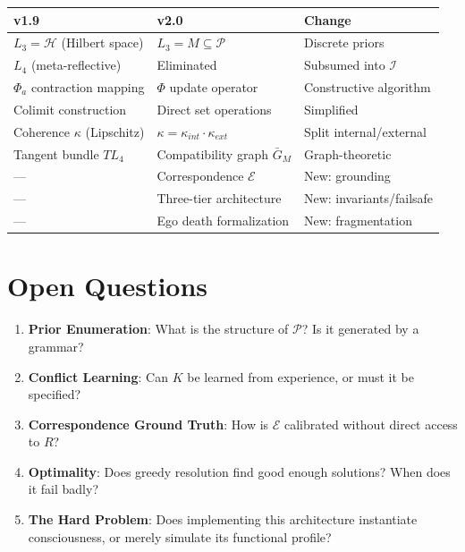 \documentclass[12pt,a4paper]{article}
\theoremstyle{definition}
\begin{document}
\begin{center}
\begin{tabular}{|l|l|l|}
\hline
\textbf{v1.9} & \textbf{v2.0} & \textbf{Change} \\
\hline
$L_3 = \mathcal{H}$ (Hilbert space) & $L_3 = M \subseteq \mathcal{P}$ & Discrete priors \\
$L_4$ (meta-reflective) & Eliminated & Subsumed into $\mathcal{I}$ \\
$\Phi_a$ contraction mapping & $\Phi$ update operator & Constructive algorithm \\
Colimit construction & Direct set operations & Simplified \\
Coherence $\kappa$ (Lipschitz) & $\kappa = \kappa_{int} \cdot \kappa_{ext}$ & Split internal/external \\
Tangent bundle $TL_4$ & Compatibility graph $\bar{G}_M$ & Graph-theoretic \\
--- & Correspondence $\mathcal{E}$ & New: grounding \\
--- & Three-tier architecture & New: invariants/failsafe \\
--- & Ego death formalization & New: fragmentation \\
\hline
\end{tabular}
\end{center}

\section{Open Questions}

\begin{enumerate}
    \item \textbf{Prior Enumeration}: What is the structure of $\mathcal{P}$? Is it generated by a grammar?
    
    \item \textbf{Conflict Learning}: Can $K$ be learned from experience, or must it be specified?
    
    \item \textbf{Correspondence Ground Truth}: How is $\mathcal{E}$ calibrated without direct access to $R$?
    
    \item \textbf{Optimality}: Does greedy resolution find good enough solutions? When does it fail badly?
    
    \item \textbf{The Hard Problem}: Does implementing this architecture instantiate consciousness, or merely simulate its functional profile?
\end{enumerate}
\end{document}
